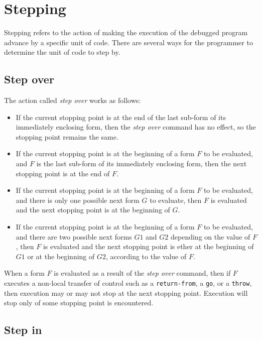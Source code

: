 \chapter{Stepping}

Stepping refers to the action of making the execution of the debugged
program advance by a specific unit of code.  There are several ways
for the programmer to determine the unit of code to step by.

\section{Step over}

The action called \emph{step over} works as follows:

\begin{itemize}
\item If the current stopping point is at the end of the last sub-form
  of its immediately enclosing form, then the \emph{step over} command
  has no effect, so the stopping point remains the same.
\item If the current stopping point is at the beginning of a form $F$
  to be evaluated, and $F$ is the last sub-form of its immediately
  enclosing form, then the next stopping point is at the end of $F$.
\item If the current stopping point is at the beginning of a form $F$
  to be evaluated, and there is only one possible next form $G$ to
  evaluate, then $F$ is evaluated and the next stopping point is at
  the beginning of $G$.
\item If the current stopping point is at the beginning of a form $F$
  to be evaluated, and there are two possible next forms $G1$ and $G2$
  depending on the value of $F$, then $F$ is evaluated and the next
  stopping point is ether at the beginning of $G1$ or at the beginning
  of $G2$, according to the value of $F$.
\end{itemize}

When a form $F$ is evaluated as a result of the \emph{step over} command,
then if $F$ executes a non-local transfer of control such as a
\texttt{return-from}, a \texttt{go}, or a \texttt{throw}, then
execution may or may not stop at the next stopping point.  Execution
will stop only of some stopping point is encountered.

\section{Step in}

